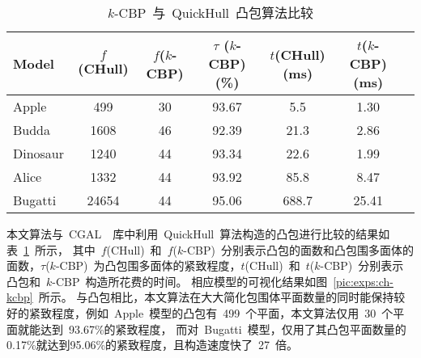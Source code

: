 \begin{table}[htbp] 
\centering
\caption{$k$-CBP~与~QuickHull~凸包算法比较}
\label{tab:exp:cgal}
\begin{tabular}{lcccccl}
\toprule[1.5pt]
 Model & $f$(CHull)& $f$($k$-CBP) & $\tau$ ($k$-CBP)(\%) & $t$(CHull)(ms) & $t$($k$-CBP)(ms)\\ %
\midrule[1.5pt]
  Apple	& 499 & 30 & 93.67 & 5.5 & 1.30 \\ %
  Budda	& 1608 & 46 & 92.39 & 21.3 & 2.86 \\ %
  Dinosaur	& 1240 & 44 & 93.34 & 22.6 & 1.99 \\  %
  Alice	& 1332 & 44 & 93.92 & 85.8 & 8.47\\ %
  Bugatti & 24654 & 44 & 95.06 & 688.7 & 25.41 \\
\bottomrule[1.5pt]
\end{tabular}
\end{table}

本文算法与~CGAL~\cite{cgal}~库中利用~QuickHull~算法构造的凸包进行比较的结果如表~\ref{tab:exp:cgal}~所示，
其中~$f$(CHull)~和~$f$($k$-CBP)~分别表示凸包的面数和凸包围多面体的面数，$\tau$($k$-CBP)~为凸包围多面体的紧致程度，$t$(CHull)~和~$t$($k$-CBP)~分别表示凸包和~$k$-CBP~构造所花费的时间。
相应模型的可视化结果如图~\ref{pic:exps:ch-kcbp}~所示。
与凸包相比，本文算法在大大简化包围体平面数量的同时能保持较好的紧致程度，例如~Apple~模型的凸包有~499~个平面，本文算法仅用~30~个平面就能达到~93.67\%的紧致程度，
而对~Bugatti~模型，仅用了其凸包平面数量的0.17\%就达到95.06\%的紧致程度，且构造速度快了~27~倍。

